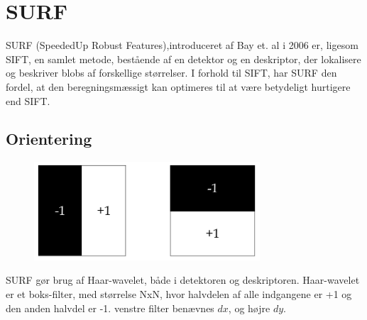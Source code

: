 \section{SURF}
SURF (SpeededUp Robust Features),introduceret af Bay et. al \cite{SURF} i 2006 er, ligesom SIFT, en samlet metode, bestående af en detektor og en deskriptor, der lokalisere og beskriver blobs af forskellige størrelser. I forhold til SIFT, har SURF den fordel, at den beregningsmæssigt kan optimeres til at være betydeligt hurtigere end SIFT.

\subsection{Orientering}
\begin{figure}[H]
    \centering
    \includegraphics[width=0.75\textwidth]{fig/haarwavelet.png}
     \vspace{-1em}
    \begin{center}    
       \caption{\textcolor{gray}{\footnotesize \textit{ }}}
    \label{fig:haarwavelet}
     \end{center}
     \vspace{-2.5em}
  \end{figure} \noindent
SURF gør brug af Haar-wavelet, både i detektoren og deskriptoren. Haar-wavelet er et boks-filter, med størrelse NxN, hvor halvdelen af alle indgangene er +1 og den anden halvdel er -1. venstre filter benævnes $dx$, og højre $dy$.
